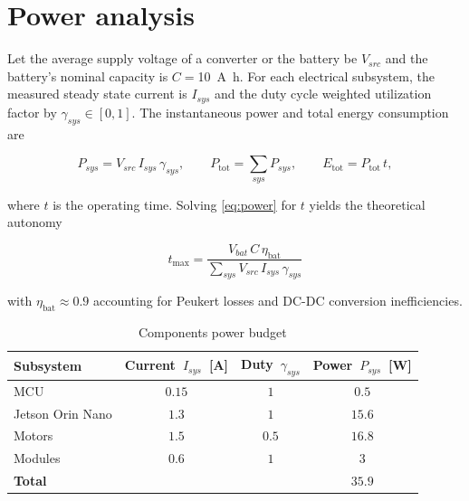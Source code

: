 \section{Power analysis}
\label{sec:power_analysis}

Let the average supply voltage of a converter or the battery be \(V_{src}\) and the battery's nominal capacity is $C=$\SI{10}{\ampere\hour}.
For each electrical subsystem, the measured steady state current is \(I_{sys}\) and the duty cycle weighted utilization factor by \(\gamma_{sys}\in[0,1]\).
The instantaneous power and total energy consumption are

\begin{equation}
  P_{sys} = V_{src}\,I_{sys}\,\gamma_{sys},
  \qquad
  P_{\mathrm{tot}} = \sum_{sys} P_{sys},
  \qquad
  E_{\mathrm{tot}} = P_{\mathrm{tot}}\,t,
  \label{eq:power}
\end{equation}

where \(t\) is the operating time.
Solving \eqref{eq:power} for \(t\) yields the theoretical autonomy

\begin{equation}
  t_{\max} = \frac{V_{bat}\,C\,\eta_\mathrm{bat}}{\sum_{sys} V_{src}\,I_{sys}\,\gamma_{sys}}
  \label{eq:runtime}
\end{equation}

with \(\eta_\mathrm{bat}\approx0.9\) accounting for Peukert losses and DC-DC conversion inefficiencies.

\begin{table}[H]
  \centering
  \label{tab:power_budget}
  \begin{tabular}{l c c c}
    \toprule
    \textbf{Subsystem}
     & \textbf{Current}~$I_{sys}$~[A]
     & \textbf{Duty}~$\gamma_{sys}$
     & \textbf{Power}~$P_{sys}$~[W]   \\
    \midrule
    MCU
     & $0.15$
     & $1$
     & $0.5$                          \\

    Jetson Orin Nano
     & $1.3$
     & $1$
     & $15.6$                         \\

    Motors
     & $1.5$
     & $0.5$
     & $16.8$                         \\
    Modules
     & $0.6$
     & $1$
     & $3$                            \\
    \midrule
    \textbf{Total}
     &
     &
     & $35.9$                         \\
    \bottomrule
  \end{tabular}
  \caption{Components power budget}
\end{table}



